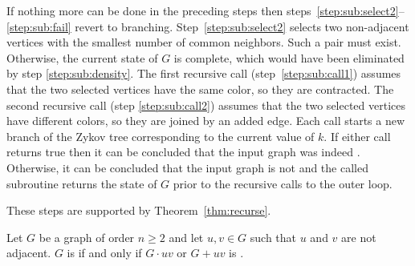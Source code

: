 If nothing more can be done in the preceding steps then steps~\ref{step:sub:select2}--\ref{step:sub:fail} revert to
branching.  Step~\ref{step:sub:select2} selects two non-adjacent vertices with the smallest number of common
neighbors.  Such a pair must exist.  Otherwise, the current state of \(G\) is complete, which would have been
eliminated by step \ref{step:sub:density}.  The first recursive call (step~\ref{step:sub:call1}) assumes that the
two selected vertices have the same color, so they are contracted.  The second recursive call (step
\ref{step:sub:call2}) assumes that the two selected vertices have different colors, so they are joined by an added
edge.  Each call starts a new branch of the Zykov tree corresponding to the current value of \(k\).  If either call
returns true then it can be concluded that the input graph was indeed .  Otherwise, it can be
concluded that the input graph is not  and the called subroutine returns the state of \(G\) prior to
the recursive calls to the outer loop.

These steps are supported by Theorem~\ref{thm:recurse}.

\begin{theorem}
  \label{thm:recurse}
  Let \(G\) be a graph of order \(n\ge2\) and let \(u,v\in G\) such that \(u\) and \(v\) are not adjacent.  \(G\)
  is  if and only if \(G\cdot uv\) or \(G+uv\) is .
\end{theorem}

